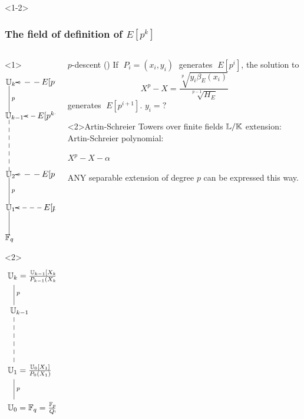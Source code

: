 \documentclass[10pt,usepdftitle=false]{beamer}
\begin{document}
\begin{frame}<1-2>
  \frametitle{The field of definition of $E[p^k]$}
  
  \begin{columns}
    \begin{column}{0.3\textwidth}
      \begin{overlayarea}{\textwidth}{0.9\textheight}
        \begin{onlyenv}<1>
          \large\[\xymatrix@C=20pt{
            *[r]{\U_k} \ar@{-}[d]^p & E[p^k] \ar@{-->}[l]\\
            *[r]{\U_{k-1}} \ar@{--}[dd] & E[p^{k-1}] \ar@{-->}[l]\\
            \\
            *[r]{\U_2} \ar@{-}[d]^p & E[p^2] \ar@{-->}[l]\\
            *[r]{\U_1} \ar@{-}[d] & E[p] \ar@{-->}[l]\\
            *[r]{\F_q}
          }\]
        \end{onlyenv}
        \begin{onlyenv}<2>
          \Large\[\xymatrix{
            *+[r]{\U_k = \frac{\U_{k-1}[X_k]}{P_{k-1}(X_k)}}\ar@{-}[d]^p\\
            *+[r]{\U_{k-1}} \ar@{--}[dd]\\
            \\
            *+[r]{\U_{1} = \frac{\U_0[X_1]}{P_0(X_1)}} \ar@{-}[d]^p\\
            *+[r]{\U_{0} = \F_q = \frac{\F_p[X_0]}{Q(X_0)}}
          }\]
        \end{onlyenv}
      \end{overlayarea}
    \end{column}
    \begin{column}{0.65\textwidth}
      \begin{block}{$p$-descent (\cite{voloch90})}
        If $\;P_i=(x_i,y_i)\;$ generates $\;E[p^i]$, the solution to
        \[X^p - X = \frac{\sqrt[p]{y_i\beta_E(x_i)}}{\sqrt[p-1]{H_E}}\]
        generates $\;E[p^{i+1}]$. $y_i=?$
      \end{block}

      \begin{block}<2>{Artin-Schreier Towers over finite fields}
        $\mathbb{L}/\mathbb{K}$ extension: Artin-Schreier polynomial:
        
        \begin{center}
          \Large\emph{$X^p - X - \alpha$}
        \end{center}

        \alert{ANY} separable extension of degree $p$ can be expressed
        this way.
      \end{block}
    \end{column}
  \end{columns}
\end{frame}
\end{document}

